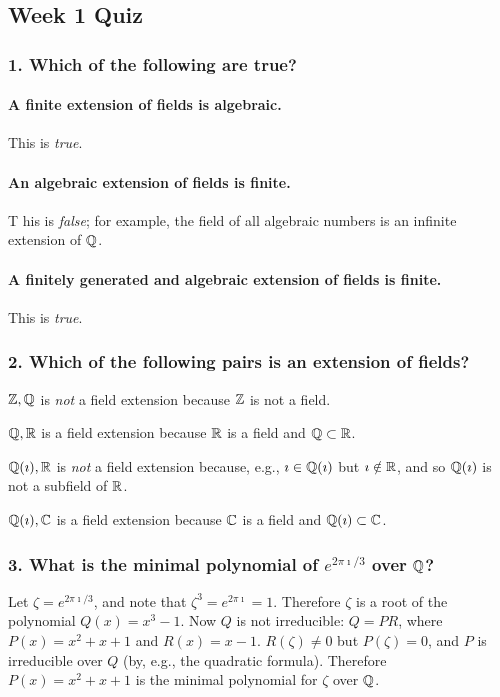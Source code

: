 \subsection[Quiz]{Week 1 Quiz}

\subsubsection*{1. Which of the following are true?}
\paragraph*{A finite extension of fields is algebraic.} 
This is \emph{true}.

\paragraph*{An algebraic extension of fields is finite.} T
his is \emph{false}; for example, the field of all algebraic numbers is an infinite extension of $\mathbb{Q}$.

\paragraph*{A finitely generated and algebraic extension of fields is finite.}
This is \emph{true}.

\subsubsection*{2. Which of the following pairs is an extension of fields?}
$\mathbb{Z}, \mathbb{Q}$ is \emph{not} a field extension because $\mathbb{Z}$ is not a field.

$\mathbb{Q}, \mathbb{R}$ is a field extension because $\mathbb{R}$ is a field and $\mathbb{Q} \subset \mathbb{R}$.

$\mathbb{Q}(\imath), \mathbb{R}$ is \emph{not} a field extension because, e.g., $\imath \in \mathbb{Q}(\imath)$ but $\imath \notin \mathbb{R}$, and so $\mathbb{Q}(\imath)$ is not a subfield of $\mathbb{R}$.

$\mathbb{Q}(\imath), \mathbb{C}$ is a field extension because $\mathbb{C}$ is a field and $\mathbb{Q}(\imath) \subset \mathbb{C}$.

\subsubsection*{3. What is the minimal polynomial of $e^{2\pi\imath/3}$ over $\mathbb{Q}$?}
Let $\zeta = e^{2\pi\imath/3}$, and note that $\zeta^3 = e^{2\pi\imath} = 1$. Therefore $\zeta$ is a root of the polynomial $Q(x) = x^3 - 1$. Now $Q$ is not irreducible: $Q = PR$, where $P(x) = x^2 + x + 1$ and $R(x) = x - 1$. $R(\zeta) \neq 0$ but $P(\zeta) = 0$, and $P$ is irreducible over $Q$ (by, e.g., the quadratic formula). Therefore $P(x) = x^2 + x + 1$ is the minimal polynomial for $\zeta$ over $\mathbb{Q}$.

